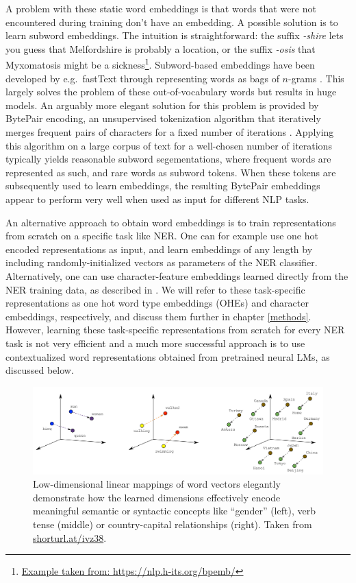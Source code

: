 \documentclass[12pt,a4paper,]{book}
\begin{document}
A problem with these static word embeddings is that words that were not encountered during training don't have an embedding. A possible solution is to learn subword embeddings. The intuition is straightforward: the suffix \emph{-shire} lets you guess that Melfordshire is probably a location, or the suffix \emph{-osis} that Myxomatosis might be a sickness\footnote{\href{https://nlp.h-its.org/bpemb/\#}{Example taken from: https://nlp.h-its.org/bpemb/}}. Subword-based embeddings have been developed by e.g.~fastText through representing words as bags of \(n\)-grams \citep{bojanowski2017}. This largely solves the problem of these out-of-vocabulary words but results in huge models. An arguably more elegant solution for this problem is provided by BytePair encoding, an unsupervised tokenization algorithm that iteratively merges frequent pairs of characters for a fixed number of iterations \citep{sennrich2016}. Applying this algorithm on a large corpus of text for a well-chosen number of iterations typically yields reasonable subword segementations, where frequent words are represented as such, and rare words as subword tokens. When these tokens are subsequently used to learn embeddings, the resulting BytePair embeddings appear to perform very well when used as input for different NLP tasks.

An alternative approach to obtain word embeddings is to train representations from scratch on a specific task like NER. One can for example use one hot encoded representations as input, and learn embeddings of any length by including randomly-initialized vectors as parameters of the NER classifier. Alternatively, one can use character-feature embeddings learned directly from the NER training data, as described in \citep{lample2016}. We will refer to these task-specific representations as one hot word type embeddings (OHEs) and character embeddings, respectively, and discuss them further in chapter \ref{methods}. However, learning these task-specific representations from scratch for every NER task is not very efficient and a much more successful approach is to use contextualized word representations obtained from pretrained neural LMs, as discussed below.

\begin{figure}

{\centering \includegraphics[width=1\linewidth]{images/word_vectors} 

}

\caption{Low-dimensional linear mappings of word vectors elegantly demonstrate how the learned dimensions effectively encode meaningful semantic or syntactic concepts like ``gender'' (left), verb tense (middle) or country-capital relationships (right). Taken from \url{shorturl.at/ivz38}.}\label{fig:w2v}
\end{figure}
\end{document}
